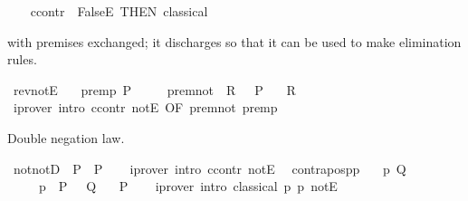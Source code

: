 \begin{isabellebody}
\ \ \isamarkupfalse%
\isanewline
{}\isamarkupfalse%
%
\endisatagproof
{\isafoldproof}%
%
\isadelimproof
\isanewline
%
\endisadelimproof
\isanewline
{}\isamarkupfalse%
\ ccontr\ {\isacharequal}{\kern0pt}\ FalseE\ {\isacharbrackleft}{\kern0pt}THEN\ classical{\isacharbrackright}{\kern0pt}%
\begin{isamarkuptext}%
 with premises exchanged; it discharges  so that it can be used to
  make elimination rules.%
\end{isamarkuptext}\isamarkuptrue%
\isamarkupfalse%
\ rev{\isacharunderscore}{\kern0pt}notE{\isacharcolon}{\kern0pt}\isanewline
\ \ \ premp{\isacharcolon}{\kern0pt}\ P\isanewline
\ \ \ \ \ premnot{\isacharcolon}{\kern0pt}\ {\isachardoublequoteopen}{\isasymnot}\ R\ {\isasymLongrightarrow}\ {\isasymnot}\ P{\isachardoublequoteclose}\isanewline
\ \ \ R\isanewline
%
\isadelimproof
\ \ %
\endisadelimproof
%
\isatagproof
{}\isamarkupfalse%
\ {\isacharparenleft}{\kern0pt}iprover\ intro{\isacharcolon}{\kern0pt}\ ccontr\ notE\ {\isacharbrackleft}{\kern0pt}OF\ premnot\ premp{\isacharbrackright}{\kern0pt}{\isacharparenright}{\kern0pt}%
\endisatagproof
{\isafoldproof}%
%
\isadelimproof
%
\endisadelimproof
%
\begin{isamarkuptext}%
Double negation law.%
\end{isamarkuptext}\isamarkuptrue%
\isamarkupfalse%
\ notnotD{\isacharcolon}{\kern0pt}\ {\isachardoublequoteopen}{\isasymnot}{\isasymnot}\ P\ {\isasymLongrightarrow}\ P{\isachardoublequoteclose}\isanewline
%
\isadelimproof
\ \ %
\endisadelimproof
%
\isatagproof
{}\isamarkupfalse%
\ {\isacharparenleft}{\kern0pt}iprover\ intro{\isacharcolon}{\kern0pt}\ ccontr\ notE\ {\isacharparenright}{\kern0pt}%
\endisatagproof
{\isafoldproof}%
%
\isadelimproof
\isanewline
%
\endisadelimproof
\isanewline
{}\isamarkupfalse%
\ contrapos{\isacharunderscore}{\kern0pt}pp{\isacharcolon}{\kern0pt}\isanewline
\ \ \ p{}{\isacharcolon}{\kern0pt}\ Q\isanewline
\ \ \ \ \ p{}{\isacharcolon}{\kern0pt}\ {\isachardoublequoteopen}{\isasymnot}\ P\ {\isasymLongrightarrow}\ {\isasymnot}\ Q{\isachardoublequoteclose}\isanewline
\ \ \ P\isanewline
%
\isadelimproof
\ \ %
\endisadelimproof
%
\isatagproof
{}\isamarkupfalse%
\ {\isacharparenleft}{\kern0pt}iprover\ intro{\isacharcolon}{\kern0pt}\ classical\ p{}\ p{}\ notE{\isacharparenright}{\kern0pt}%

\end{isabellebody}
